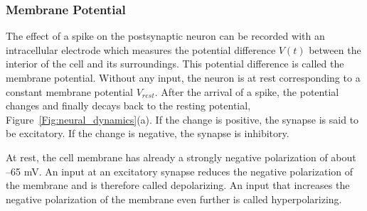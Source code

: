 \subsubsection{Membrane Potential}
The effect of a spike on the postsynaptic neuron can be recorded with an intracellular electrode which measures the potential difference $V(t)$ between the interior of the cell and its surroundings. This potential difference is called the membrane potential. Without any input, the neuron is at rest corresponding to a constant membrane potential $V_{rest}$. After the arrival of a spike, the potential changes and finally decays back to the resting potential, Figure~\ref{Fig:neural_dynamics}(a).
If the change is positive, the synapse is said to be excitatory. If the change is negative, the synapse is inhibitory.

At rest, the cell membrane has already a strongly negative polarization of about –65 mV. An input at an excitatory synapse reduces the negative polarization of the membrane and is therefore called depolarizing. An input that increases the negative polarization of the membrane even further is called hyperpolarizing.


